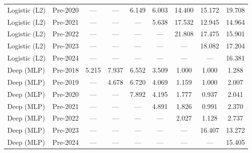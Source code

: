 \begin{table}[htbp]
{\begin{tabular}{l lccccccc}
Logistic (L2) & Pre-2020 & --- & --- & 6.149 & 6.003 & 14.400 & 15.172 & 19.708 \\
Logistic (L2) & Pre-2021 & --- & --- & --- & 5.638 & 17.532 & 12.945 & 14.964 \\
Logistic (L2) & Pre-2022 & --- & --- & --- & --- & 21.808 & 17.475 & 15.901 \\
Logistic (L2) & Pre-2023 & --- & --- & --- & --- & --- & 18.082 & 17.204 \\
Logistic (L2) & Pre-2024 & --- & --- & --- & --- & --- & --- & 16.381 \\
Deep (MLP) & Pre-2018 & 5.215 & 7.937 & 6.552 & 3.509 & 1.000 & 1.000 & 1.288 \\
Deep (MLP) & Pre-2019 & --- & 4.678 & 6.720 & 4.069 & 1.159 & 1.000 & 2.007 \\
Deep (MLP) & Pre-2020 & --- & --- & 7.892 & 4.195 & 1.777 & 0.937 & 2.041 \\
Deep (MLP) & Pre-2021 & --- & --- & --- & 4.891 & 1.826 & 0.991 & 2.370 \\
Deep (MLP) & Pre-2022 & --- & --- & --- & --- & 2.027 & 1.128 & 2.737 \\
Deep (MLP) & Pre-2023 & --- & --- & --- & --- & --- & 16.407 & 13.272 \\
Deep (MLP) & Pre-2024 & --- & --- & --- & --- & --- & --- & 15.405 \\
\bottomrule
\end{tabular}%
}
\end{table}